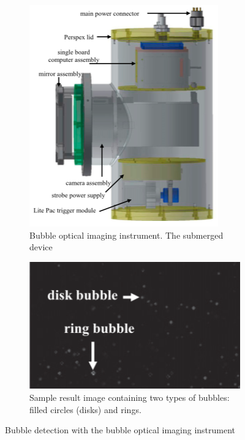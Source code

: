 		\begin{figure}[h]
			\centering
			\begin{subfigure}[t]{0.4\textwidth}
				\centering
				\includegraphics[scale=.3]{images/bubble_optical_imaging_instrument.png}
				\caption{Bubble optical imaging instrument. The submerged device }
				\label{subfig:optical_imaging}
			\end{subfigure}\hfill
			\begin{subfigure}[t]{0.4\textwidth}
				\centering
				\includegraphics[scale=.5]{images/sample_result_optical_imaging_instrument.png}
				\caption{Sample result image containing two types of bubbles: filled circles (disks) and rings. }
				\label{subfig:result_optical_imaging}
			\end{subfigure}
			\label{fig:optical_imaging}
			\caption{Bubble detection with the bubble optical imaging instrument}
		\end{figure}		























